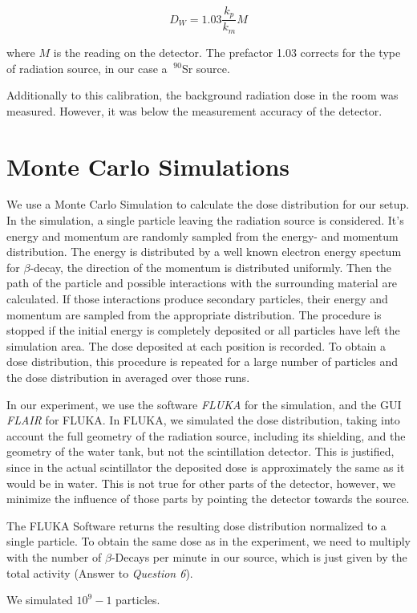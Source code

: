 \documentclass[a4paper,parskip]{scrartcl}
\begin{document}
$$D_W = 1.03\frac{k_p}{k_m}M$$

where $M$ is the reading on the detector. The prefactor 1.03 corrects for the type of radiation source, in our case a $~^{90}$Sr source.

Additionally to this calibration, the background radiation dose in the room was measured. However, it was below the measurement accuracy of the detector.

\section{Monte Carlo Simulations}
We use a Monte Carlo Simulation to calculate the dose distribution for our setup. In the simulation, a single particle leaving the radiation source is considered. It's energy and momentum are randomly sampled from the energy- and momentum distribution. The energy is distributed by a well known electron energy spectum for $\beta$-decay, the direction of the momentum is distributed uniformly. Then the path of the particle and possible interactions with the surrounding material are calculated. If those interactions produce secondary particles, their energy and momentum are sampled from the appropriate distribution. The procedure is stopped if the initial energy is completely deposited or all particles have left the simulation area. The dose deposited at each position is recorded. To obtain a dose distribution, this procedure is repeated for a large number of particles and the dose distribution in averaged over those runs.

In our experiment, we use the software \textit{FLUKA} for the simulation, and the GUI \textit{FLAIR} for FLUKA. In FLUKA, we simulated the dose distribution, taking into account the full geometry of the radiation source, including its shielding, and the geometry of the water tank, but not the scintillation detector. This is justified, since in the actual scintillator the deposited dose is approximately the same as it would be in water. This is not true for other parts of the detector, however, we minimize the influence of those parts by pointing the detector towards the source.

The FLUKA Software returns the resulting dose distribution normalized to a single particle. To obtain the same dose as in the experiment, we need to multiply with the number of $\beta$-Decays per minute in our source, which is just given by the total activity (Answer to \textit{Question 6}).

We simulated $10^9-1$ particles. 
\end{document}
